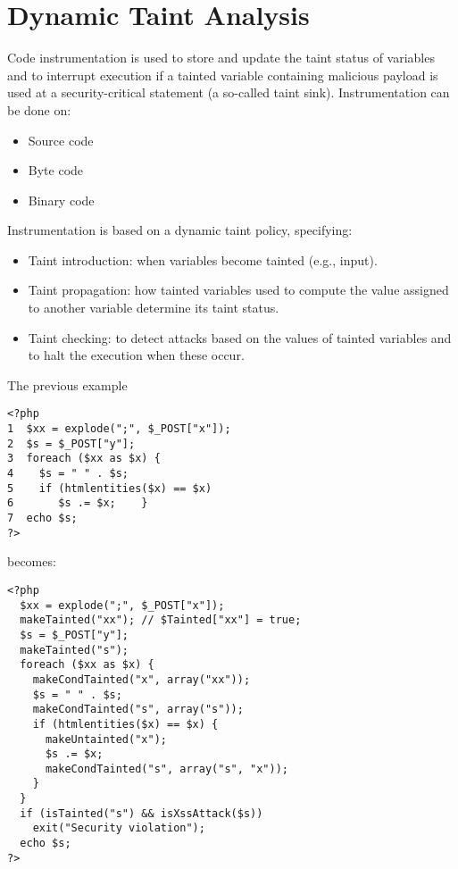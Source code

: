 \documentclass[a4paper, 10pt, titlepage]{article}
\begin{document}
\newpage
\section{Dynamic Taint Analysis}
Code instrumentation is used to store and update the taint status of variables and to interrupt execution if a tainted variable containing malicious payload is used at a security-critical statement (a so-called taint sink).
Instrumentation can be done on:
\begin{itemize}
\item Source code
\item Byte code
\item Binary code
\end{itemize}
Instrumentation is based on a dynamic taint policy, specifying:
\begin{itemize}
\item Taint introduction: when variables become tainted (e.g., input).
\item Taint propagation: how tainted variables used to compute the value assigned to another variable determine its taint status.
\item Taint checking: to detect attacks based on the values of tainted variables and to halt the execution when these occur.
\end{itemize}
The previous example
\begin{lstlisting}
<?php 
1  $xx = explode(";", $_POST["x"]); 
2  $s = $_POST["y"]; 
3  foreach ($xx as $x) { 
4    $s = " " . $s; 
5    if (htmlentities($x) == $x) 
6       $s .= $x;    } 
7  echo $s; 
?>
\end{lstlisting}
becomes:
\begin{small}
\begin{lstlisting}
<?php
  $xx = explode(";", $_POST["x"]);
  makeTainted("xx"); // $Tainted["xx"] = true;
  $s = $_POST["y"];
  makeTainted("s");
  foreach ($xx as $x) {
    makeCondTainted("x", array("xx"));
    $s = " " . $s;
    makeCondTainted("s", array("s"));
    if (htmlentities($x) == $x) {
      makeUntainted("x");
      $s .= $x;
      makeCondTainted("s", array("s", "x"));
    }
  }
  if (isTainted("s") && isXssAttack($s))
    exit("Security violation");
  echo $s;
?>
\end{lstlisting}
\end{small}
\end{document}

